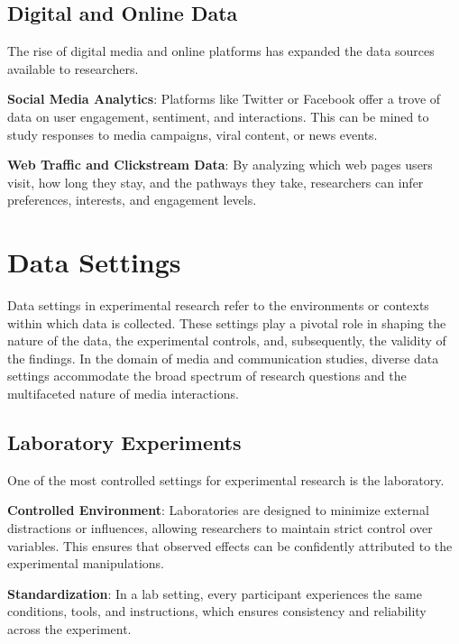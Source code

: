 \documentclass[
  b5paper]{book}
\begin{document}
\hypertarget{digital-and-online-data}{%
\subsection*{Digital and Online Data}\label{digital-and-online-data}}

The rise of digital media and online platforms has expanded the data sources available to researchers.

\textbf{Social Media Analytics}: Platforms like Twitter or Facebook offer a trove of data on user engagement, sentiment, and interactions. This can be mined to study responses to media campaigns, viral content, or news events.

\textbf{Web Traffic and Clickstream Data}: By analyzing which web pages users visit, how long they stay, and the pathways they take, researchers can infer preferences, interests, and engagement levels.

\hypertarget{data-settings}{%
\section{Data Settings}\label{data-settings}}

Data settings in experimental research refer to the environments or contexts within which data is collected. These settings play a pivotal role in shaping the nature of the data, the experimental controls, and, subsequently, the validity of the findings. In the domain of media and communication studies, diverse data settings accommodate the broad spectrum of research questions and the multifaceted nature of media interactions.

\hypertarget{laboratory-experiments}{%
\subsection*{Laboratory Experiments}\label{laboratory-experiments}}

One of the most controlled settings for experimental research is the laboratory.

\textbf{Controlled Environment}: Laboratories are designed to minimize external distractions or influences, allowing researchers to maintain strict control over variables. This ensures that observed effects can be confidently attributed to the experimental manipulations.

\textbf{Standardization}: In a lab setting, every participant experiences the same conditions, tools, and instructions, which ensures consistency and reliability across the experiment.
\end{document}
